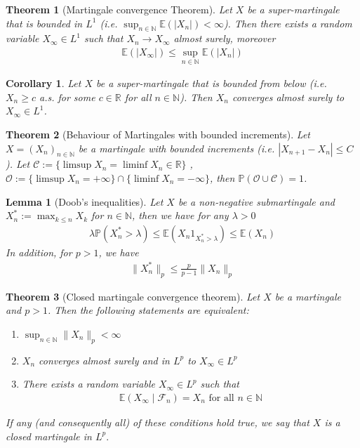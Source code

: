 \documentclass[11pt,a4paper, final]{article}
\newtheorem{lem}{Lemma}[section]
\newtheorem{thm}{Theorem}[section]
\newtheorem{cor}{Corollary}[section]
\theoremstyle{definition}
\begin{document}
\begin{thm}[Martingale convergence Theorem] Let $X$ be a super-martingale that is bounded in $L^1$ (i.e. $\sup_{n \in \mathbb{N}} \mathbb{E}(|X_n|) < \infty$). Then there exists a random variable $X_\infty \in L^1$ such that $X_n \to X_\infty$ almost surely, moreover 
\begin{align*}
\mathbb{E}(|X_\infty|) \leq \sup_{n \in \mathbb{N}} \mathbb{E}(|X_n|)
\end{align*}
\end{thm}
\begin{cor} Let $X$ be a super-martingale that is bounded from below (i.e. $X_n \geq c$ a.s. for some $c \in \mathbb{R}$ for all $n \in \mathbb{N}$). Then $X_n$ converges almost surely to $X_\infty \in L^1$. 
\end{cor}
\begin{thm}[Behaviour of Martingales with bounded increments] Let $X=(X_n)_{n \in \mathbb{N}}$ be a martingale with bounded increments (i.e. $|X_{n+1}-X_n| \leq C$). Let $\mathcal{C}:= \lbrace \limsup X_n = \liminf X_n \in \mathbb{R} \rbrace$ , $\mathcal{O}:= \lbrace \limsup X_n = + \infty \rbrace \cap \lbrace \liminf X_n = - \infty \rbrace $, then $\mathbb{P}( \mathcal{O} \cup \mathcal{C}) = 1$.  
\end{thm}
\begin{lem}[Doob's inequalities] Let $X$ be a non-negative submartingale and $X_n^*:= \max_{k \leq n} X_k$ for $n \in \mathbb{N}$, then we have for any $\lambda >0$
\begin{align*}
\lambda \mathbb{P}(X_n^* > \lambda)  \leq \mathbb{E}(X_n 1_{X_n^* > \lambda})  \leq \mathbb{E}(X_n) 
\end{align*}
In addition, for $p > 1$, we have
\begin{align*}
\|X_n^*\|_p \leq \frac{p}{p-1} \| X_n \|_p 
\end{align*}
\end{lem}
\begin{thm}[Closed martingale convergence theorem] Let $X$ be a martingale and $p>1$. Then the following statements are equivalent:
\begin{enumerate}
\item $\sup_{n \in \mathbb{N}} \|X_n\|_p < \infty$ 
\item $X_n$ converges almost surely and in $L^p$ to $X_\infty \in L^p$ 
\item There exists a random variable $X_\infty \in L^p$ such that 
\begin{align*}
\mathbb{E}(X_\infty \mid \mathcal{F}_n) = X_n \text{ for all } n \in \mathbb{N}
\end{align*}
\end{enumerate}
If any (and consequently all) of these conditions hold true, we say that $X$ is a closed martingale in $L^p.$
\end{thm}
\end{document}
